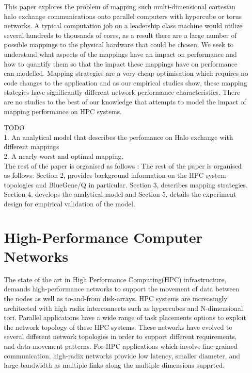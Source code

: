 \documentclass[conference,10pt]{IEEEtran}
\begin{document}
This paper explores the problem of mapping such multi-dimensional cartesian
halo exchange communications onto parallel computers with hypercube or
torus networks. A typical computation job on a leadership class machine would
utilize several hundreds to thousands of cores, as a result there are a large number of
possible mappings to the physical hardware that could be chosen. We seek to understand
what aspects of the mappings have an impact on performance and how to quantify them so
that the impact these mappings have on performance can modelled. Mapping strategies
are a very cheap optimisation which requires no code changes to the application
and as our empirical studies show, these mapping stategies have significantly
different network performance characteristics. There are no studies to the best
of our knowledge that attempts to model the impact of mapping performance on
HPC systems.

TODO\\
1. An analytical model that describes the perfomance on Halo exchange with different mappings\\
2. A nearly worst and optimal mapping.\\

The rest of the paper is organised as follows :
The rest of the paper is organised as follows: Section 2, provides background information on
the HPC system topologies and BlueGene/Q in particular. Section 3, describes mapping strategies.
Section 4, develops the analytical model and Section 5, details the experiment design for empirical
validation of the model.


\section{High-Performance Computer Networks}

The state of the art in High Performance Computing(HPC) infrastructure, demands high-performance networks
to support the movement of data between the nodes as well as to-and-from disk-arrays. HPC systems are
increasingly architected with high radix interconnects such as hypercubes and N-dimensional tori.
Parallel applications have a wide range of task placements options to exploit the network topology of
these HPC systems. These networks have evolved to several different network topologies in order to support
different requirements, and data movement patterns. For HPC applications which involve fine-grained communication,
high-radix networks provide low latency, smaller diameter, and large bandwidth as multiple links along the multiple
dimensions supprted.
\end{document}
